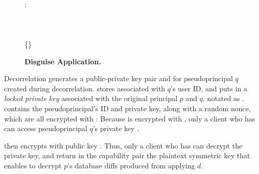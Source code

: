 \begin{figure*}[t!]
{\pcforeach {} \in {}\\
\quad \pcif {}: \\
\quad\quad {} \gets {}\\
\quad\quad {}\\
\pcendforeach\pclb
{}
\<  \< \\
\<\< \{\addr{}\}\gets{} \pclb
{}
}
\caption{\textbf{Disguise Application.}}
\label{fig:disgapp}
\end{figure*} 
\fi

\iffalse
{}
Decorrelation generates a public-private key pair  and  for pseudoprincipal $q$
created during decorrelation.
\sys stores  associated with $q$'s user ID, and puts  in a \emph{locked private key}
associated with the original principal $p$ and $q$, notated as .  contains the
pseudoprincipal's ID and private key, along with a random nonce, which are all encrypted with :
Because  is encrypted with , only a client who has
 can access pseudoprincipal $q$'s private key .


\sys then encrypts  with public key .  
%
Thus, only a client who has  can decrypt the private key, and return in the capability pair the plaintext symmetric key that enables \sys to decrypt $p$'s database diffs produced from applying $d$.



